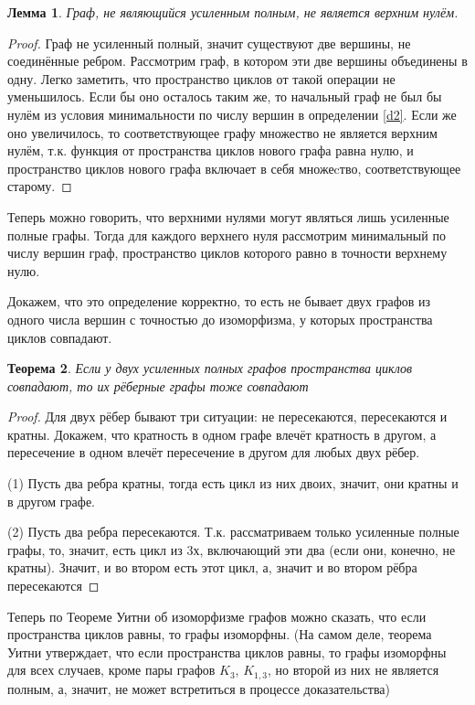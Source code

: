 \documentclass[a4paper]{article}
\newtheorem{theorem}{Теорема}[section]
\newtheorem{lemma}[theorem]{Лемма}
\theoremstyle{definition}
\begin{document}
\begin{lemma}
	Граф, не являющийся усиленным полным, не является верхним нулём.
\end{lemma}
\begin{proof}
	Граф не усиленный полный, значит существуют две вершины, не соединённые ребром. Рассмотрим граф, в котором эти две вершины объединены в одну. Легко заметить, что пространство циклов от такой операции не уменьшилось. Если бы оно осталось таким же, то начальный граф не был бы нулём из условия минимальности по числу вершин в определении \ref{d2}. Если же оно увеличилось, то соответствующее графу множество не является верхним нулём, т.к. функция от пространства циклов нового графа равна нулю, и пространство циклов нового графа включает в себя множеcтво, соответствующее старому.
\end{proof}

Теперь можно говорить, что верхними нулями могут являться лишь усиленные полные графы.
Тогда для каждого верхнего нуля рассмотрим минимальный по числу вершин граф, пространство циклов которого равно в точности верхнему нулю.

Докажем, что это определение корректно, то есть не бывает двух графов из одного числа вершин с точностью до изоморфизма, у которых пространства циклов совпадают.
\begin{theorem} \label{r1}
	Если у двух усиленных полных графов пространства циклов совпадают, то их рёберные графы тоже совпадают
\end{theorem}
\begin{proof}
	Для двух рёбер бывают три ситуации: не пересекаются, пересекаются и кратны. Докажем, что кратность в одном графе влечёт кратность в другом, а пересечение в одном влечёт пересечение в другом для любых двух рёбер.
	
	(1) Пусть два ребра кратны, тогда есть цикл из них двоих, значит, они кратны и в другом графе.
	
	(2) Пусть два ребра пересекаются. Т.к. рассматриваем только усиленные полные графы, то, значит, есть цикл из 3х, включающий эти два (если они, конечно, не кратны). Значит, и во втором есть этот цикл, а, значит и во втором рёбра пересекаются
\end{proof}

Теперь по Теореме Уитни об изоморфизме графов можно сказать, что если пространства циклов равны, то графы изоморфны.
(На самом деле, теорема Уитни утверждает, что если пространства циклов равны, то графы изоморфны для всех случаев, кроме пары графов $K_3$, $K_{1, 3}$, но второй из них не является полным, а, значит, не может встретиться в процессе доказательства)
\end{document}
